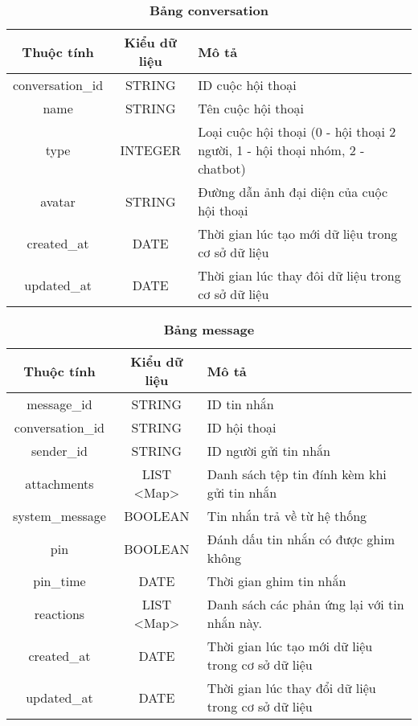 \begin{table}[H]
  \caption{\bfseries \fontsize{12pt}{0pt}\selectfont Bảng conversation}
  \centering
  \begin{tabularx}{\textwidth}{|c|c|X|}
    \hline
    \textbf{Thuộc tính} & \textbf{Kiểu dữ liệu} & \textbf{Mô tả} \\
    \hline
    conversation\_id & STRING & ID cuộc hội thoại  \\
    \hline
    name & STRING & Tên cuộc hội thoại \\
    \hline
    type & INTEGER & Loại cuộc hội thoại (0 - hội thoại 2 người, 1 - hội thoại nhóm, 2 - chatbot) \\
    \hline
    avatar & STRING & Đường dẫn ảnh đại diện của cuộc hội thoại  \\
    \hline
    created\_at & DATE & Thời gian lúc tạo mới dữ liệu trong cơ sở dữ liệu \\
    \hline
    updated\_at & DATE & Thời gian lúc thay đôi dữ liệu trong cơ sở dữ liệu \\
    \hline
  \end{tabularx}
\end{table}

\begin{table}[H]
  \caption{\bfseries \fontsize{12pt}{0pt}\selectfont Bảng message}
  \centering
  \begin{tabularx}{\textwidth}{|c|c|X|}
    \hline
    \textbf{Thuộc tính} & \textbf{Kiểu dữ liệu} & \textbf{Mô tả} \\
    \hline
    message\_id & STRING & ID tin nhắn  \\
    \hline
    conversation\_id & STRING & ID hội thoại  \\
    \hline
    sender\_id & STRING & ID người gửi tin nhắn  \\
    \hline
    attachments & LIST <Map> & Danh sách tệp tin đính kèm khi gửi tin nhắn\\
    \hline
    system\_message & BOOLEAN & Tin nhắn trả về từ hệ thống\\
    \hline
    pin & BOOLEAN & Đánh dấu tin nhắn có được ghim không\\
    \hline
    pin\_time & DATE & Thời gian ghim tin nhắn\\
    \hline
    reactions & LIST <Map> & Danh sách các phản ứng lại với tin nhắn này.\\
    \hline
    created\_at & DATE & Thời gian lúc tạo mới dữ liệu trong cơ sở dữ liệu \\
    \hline
    updated\_at & DATE & Thời gian lúc thay đổi dữ liệu trong cơ sở dữ liệu \\
    \hline
  \end{tabularx}
\end{table}

